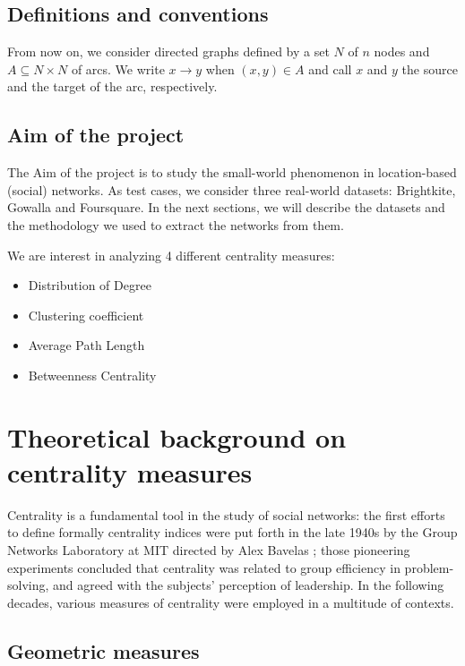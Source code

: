 \documentclass[12pt]{article}
\newcommand{\s}{\vspace*{0.4cm}}
\newcommand{\nd}{\noindent}
\begin{document}
\subsection*{Definitions and conventions}

From now on, we consider directed graphs defined by a set $N$ of $n$ nodes and $A \subseteq N \times N$ of arcs. We write $x \to y$ when $(x,y) \in A$ and call $x$ and $y$ the source and the target of the arc, respectively. \s
\clearpage

\subsection*{Aim of the project}

The Aim of the project is to study the small-world phenomenon in location-based (social) networks. As test cases, we consider three real-world datasets: Brightkite, Gowalla and Foursquare. In the next sections, we will describe the datasets and the methodology we used to extract the networks from them. \s

\nd We are interest in analyzing 4 different centrality measures:

\begin{itemize}
    \item Distribution of Degree
    \item Clustering coefficient
    \item Average Path Length
    \item Betweenness Centrality
\end{itemize}
\clearpage


\section{Theoretical background on centrality measures}

Centrality is a fundamental tool in the study of social networks: the first efforts to define formally centrality indices were put forth in the late 1940s by the Group Networks Laboratory at MIT directed by Alex Bavelas \cite{closeness}; those pioneering experiments concluded that centrality was related to group efficiency in problem-solving, and agreed with the subjects' perception of leadership. In the following decades, various measures of centrality were employed in a multitude of contexts. \s

\subsection*{Geometric measures}
\end{document}
